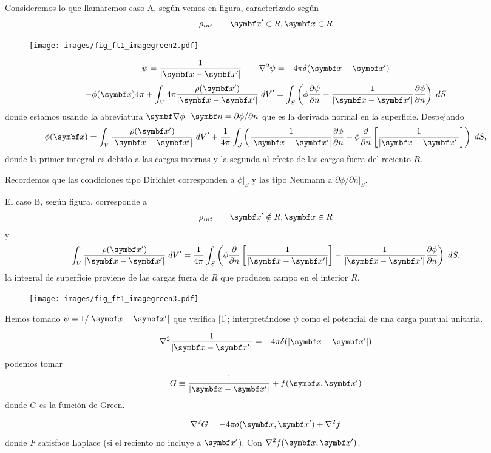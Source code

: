 \documentclass[10pt,oneside]{CBFT_book}
\begin{document}
Consideremos lo que llamaremos caso A, según vemos en figura, caracterizado según
\[
	\rho_{int} \qquad \vb{x}'\in R, \vb{x}\in R
\]
\begin{figure}[htb]
	\begin{center}
	\texttt{[image: images/fig\_ft1\_imagegreen2.pdf]}	 
	\end{center}
	\caption{}
\end{figure} 
\[
	\psi = \frac{1}{|\vb{x}-\vb{x}'|} \qquad \lapm{\psi} = -4\pi \delta(\vb{x}-\vb{x}')
\]
\[
	-\phi(\vb{x})4\pi + \int_V 4\pi \frac{\rho(\vb{x}')}{|\vb{x}-\vb{x}'|} \; dV' =
	\int_S \left( \phi\dpar{\psi}{n}-\frac{1}{|\vb{x}-\vb{x}'|}\dpar{\phi}{n}\right)\; dS 
\]
donde estamos usando la abreviatura $\Nabla\phi\cdot\vb{n}=\partial\phi/\partial n$ que es la
derivada normal en la superficie. Despejando
\[
	\phi(\vb{x}) = \int_V \frac{\rho(\vb{x}')}{|\vb{x}-\vb{x}'|} \; dV' +
	\frac{1}{4\pi} \int_S \left( \frac{1}{|\vb{x}-\vb{x}'|}\dpar{\phi}{n} -\phi\frac{\partial}{\partial 
n} \left[\frac{1}{|\vb{x}-\vb{x}'|} \right] \right)\; dS ,
\]
donde la primer integral es debido a las cargas internas y la segunda al efecto de las cargas
fuera del reciento $R$.

Recordemos que las condiciones tipo Dirichlet corresponden a $\phi|_S$ y las tipo Neumann a
$\partial\phi/\partial \hat{n}|_S$.

El caso B, según figura, corresponde a
\[
	\rho_{int} \qquad \vb{x}'\notin R, \vb{x}\in R
\]
y 
\[
	\int_V \frac{\rho(\vb{x}')}{|\vb{x}-\vb{x}'|} \; dV' = 
	\frac{1}{4\pi} \int_S \left( \phi\frac{\partial}{\partial n} \left[\frac{1}{|\vb{x}-\vb{x}'|} \right]
	- \frac{1}{|\vb{x}-\vb{x}'|}\dpar{\phi}{n}  \right)\; dS ,
\]
la integral de superficie proviene de las cargas fuera de $R$ que producen campo en el interior
$R$.

\begin{figure}[htb]
	\begin{center}
	\texttt{[image: images/fig\_ft1\_imagegreen3.pdf]}	 
	\end{center}
	\caption{}
\end{figure} 

Hemos tomado $\psi=1/|\vb{x}-\vb{x}'|$ que verifica [1]; interpretándose $\psi$ como el potencial
de una carga puntual unitaria.

\[
	\lapm{\frac{1}{|\vb{x}-\vb{x}'|}} = - 4\pi \delta( |\vb{x}-\vb{x}'| )
\]
podemos tomar
\[
	G \equiv \frac{1}{|\vb{x}-\vb{x}'|} + f( \vb{x}, \vb{x}')
\]
donde $G$ es la función de Green.

\[
	\lapm{G} = -4\pi  \delta( \vb{x}, \vb{x}' ) + \lapm{f}
\]
donde $F$ satisface Laplace (si el reciento no incluye a $\vb{x}'$).
Con $\lapm{f( \vb{x}, \vb{x}' )}$.
\end{document}
